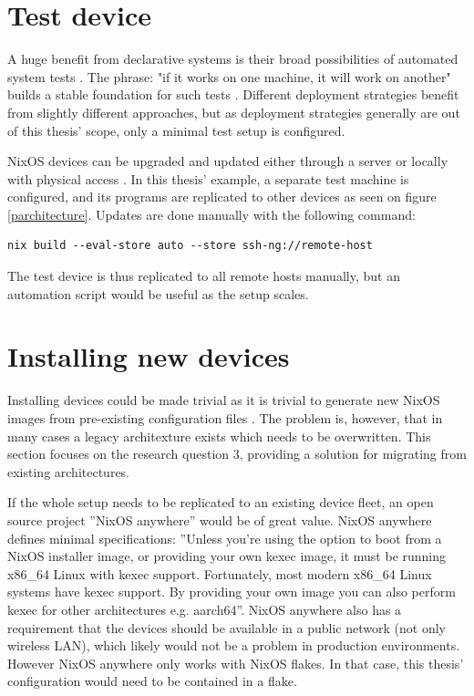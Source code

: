 \section{Test device}

A huge benefit from declarative systems is their broad possibilities
of automated system tests \cite{van2010automating}. The phrase: "if it
works on one machine, it will work on another" builds a stable
foundation for such tests \cite{nixosNixOSManual}. Different
deployment strategies benefit from slightly different approaches, but
as deployment strategies generally are out of this thesis' scope, only
a minimal test setup is configured.

NixOS devices can be upgraded and updated either through a server or locally
with physical access \cite{nixosNixOSManual}. In this thesis' example,
a separate test machine is configured, and its programs are
replicated to other devices as seen on figure
\ref{parchitecture}. Updates are done manually with the following command:

\begin{lstlisting}
nix build --eval-store auto --store ssh-ng://remote-host
\end{lstlisting}

The test device is thus replicated to all remote hosts manually, but
an automation script would be useful as the setup scales.

\section{Installing new devices} \label{instnewdevices}

Installing devices could be made trivial as it is trivial to generate new
NixOS images from pre-existing configuration files
\cite{nixosNixOSManual}. The problem is, however, that in many cases a
legacy architexture exists which needs to be overwritten. This
section focuses on the research question 3, providing a solution for
migrating from existing architectures.

If the whole setup needs to be replicated to an existing device fleet,
an open source project ''NixOS anywhere'' would be of great value. NixOS
anywhere defines minimal specifications: ''Unless you're using the
option to boot from a NixOS installer image, or providing your own
kexec image, it must be running x86\_64 Linux with kexec
support. Fortunately, most modern x86\_64 Linux systems have kexec
support. By providing your own image you can also perform kexec for
other architectures e.g. aarch64''. NixOS anywhere also has a
requirement that the devices should be available in a public network
(not only wireless LAN), which likely would not be a problem in
production environments. However NixOS anywhere  only works with NixOS
flakes. In that case, this thesis' configuration would need to be contained in a
flake. \cite{githubGitHubNixcommunitynixosanywhere}

